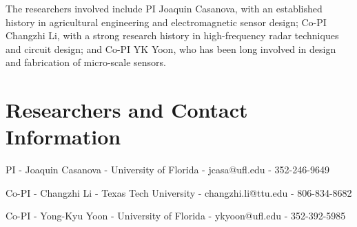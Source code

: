 \documentclass[11pt,letterpaper]{article}
\begin{document}
The researchers involved include PI Joaquin Casanova, with an established history in agricultural engineering and electromagnetic sensor design; Co-PI Changzhi Li, with a strong research history in high-frequency radar techniques and circuit design; and Co-PI YK Yoon, who has been long involved in design and fabrication of micro-scale sensors. 

\section{Researchers and Contact Information}
\begin{description}
\item{PI} - Joaquin Casanova - University of Florida - jcasa@ufl.edu - 352-246-9649
\item{Co-PI} - Changzhi Li - Texas Tech University - changzhi.li@ttu.edu - 806-834-8682
\item{Co-PI} - Yong-Kyu Yoon -  University of Florida - ykyoon@ufl.edu  - 352-392-5985
\end{description}



  
  
\end{document}
